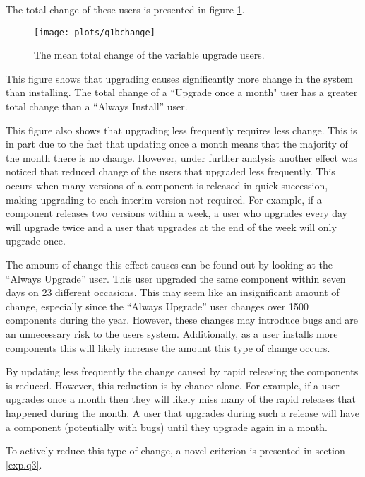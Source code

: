 The total change of these users is presented in figure \ref{exp.q1bchange}.
\begin{figure}[htp]
\begin{center}
  \texttt{[image: plots/q1bchange]}
  \caption{The mean total change of the variable upgrade users.}
  \label{exp.q1bchange}
\end{center}
\end{figure}
This figure shows that upgrading causes significantly more change in the system than installing.
The total change of a ``Upgrade once a month" user has a greater total change than a ``Always Install'' user.

This figure also shows that upgrading less frequently requires less change. 
This is in part due to the fact that updating once a month means that the majority of the month there is no change.
However, under further analysis another effect was noticed that reduced change of the users that upgraded less frequently.
This occurs when many versions of a component is released in quick succession, making upgrading to each interim version not required.
For example, if a component releases two versions within a week, a user who upgrades every day will upgrade twice and a user that upgrades at the end of the week will only upgrade once.

The amount of change this effect causes can be found out by looking at the ``Always Upgrade'' user.
This user upgraded the same component within seven days on 23 different occasions.
This may seem like an insignificant amount of change, especially since the ``Always Upgrade'' user changes over 1500 components during the year.
However, these changes may introduce bugs and are an unnecessary risk to the users system.
Additionally, as a user installs more components this will likely increase the amount this type of change occurs.

By updating less frequently the change caused by rapid releasing the components is reduced.
However, this reduction is by chance alone.
For example, if a user upgrades once a month then they will likely miss many of the rapid releases that happened during the month.
A user that upgrades during such a release will have a component (potentially with bugs) until they upgrade again in a month.

To actively reduce this type of change, a novel criterion is presented in section \ref{exp.q3}.

